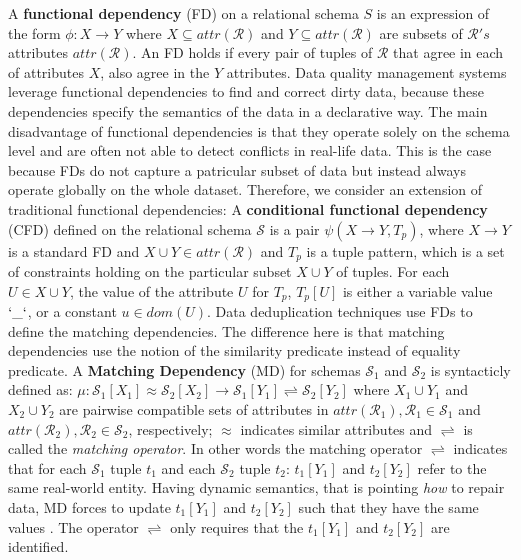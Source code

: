 A \textbf{functional dependency} (FD) on a relational schema $S$ is an expression of the form $\phi: X \rightarrow Y$ where $X \subseteq attr(\mathcal{R}) $ and $Y \subseteq attr(\mathcal{R}) $ are subsets of $\mathcal{R}'s$ attributes $attr(\mathcal{R})$. An FD holds if every pair of tuples of $\mathcal{R}$ that agree in each of attributes $X$, also agree in the $Y$ attributes. Data quality management systems leverage functional dependencies to find and correct dirty data, because these dependencies specify the semantics of the data in a declarative way. The main disadvantage of functional dependencies is that they operate solely on the schema level and are often not able to detect conflicts in real-life data. This is the case because FDs do not capture a patricular subset of data but instead always operate globally on the whole dataset.
Therefore, we consider an extension of traditional functional dependencies:  A \textbf{conditional functional dependency} (CFD) defined on the relational schema $\mathcal{S}$ is a pair $\psi(X \rightarrow Y , T_p)$,  where $X \rightarrow Y$ is a standard FD and $X \cup Y \in attr(\mathcal{R})$ and $T_p$ is a tuple pattern, which is a set of constraints holding on the particular subset $X \cup Y$ of tuples. For each $U \in X \cup Y$, the value of the attribute $U$ for $T_p$, $T_p[U]$ is either a variable value $`\_`$, or a constant $u \in dom(U)$. Data deduplication techniques use FDs to define the matching dependencies. The difference here is that matching dependencies use the notion of the similarity predicate instead of equality predicate. A \textbf{Matching Dependency} (MD) for schemas $\mathcal{S}_1$ and $\mathcal{S}_2$ is syntacticly defined as:
  $\mu: \mathcal{S}_1[X_1]\approx \mathcal{S}_2[X_2]\rightarrow \mathcal{S}_1[Y_1]\rightleftharpoons \mathcal{S}_2[Y_2]$ 
  where $X_1 \cup Y_1$ and $X_2 \cup Y_2$ are pairwise compatible sets of attributes in $attr(\mathcal{R}_1), \mathcal{R}_1\in \mathcal{S}_1$ and $attr(\mathcal{R}_2), \mathcal{R}_2\in \mathcal{S}_2$, respectively; $\approx$ indicates
  similar attributes and $\rightleftharpoons$ is called the \textit{matching operator}. In other words the matching operator $\rightleftharpoons$ indicates that for each $\mathcal{S}_1$ tuple $t_1$ and each $\mathcal{S}_2$ tuple $t_2$: $t_1[Y_1]$ and $t_2[Y_2]$ refer to the same real-world entity. Having dynamic semantics, that is pointing \textit{how} to repair data, MD forces to update $t_1[Y_1]$ and $t_2[Y_2]$ such that they have the same values . The operator $\rightleftharpoons$ only requires that the $t_1[Y_1]$ and $t_2[Y_2]$ are identified.


